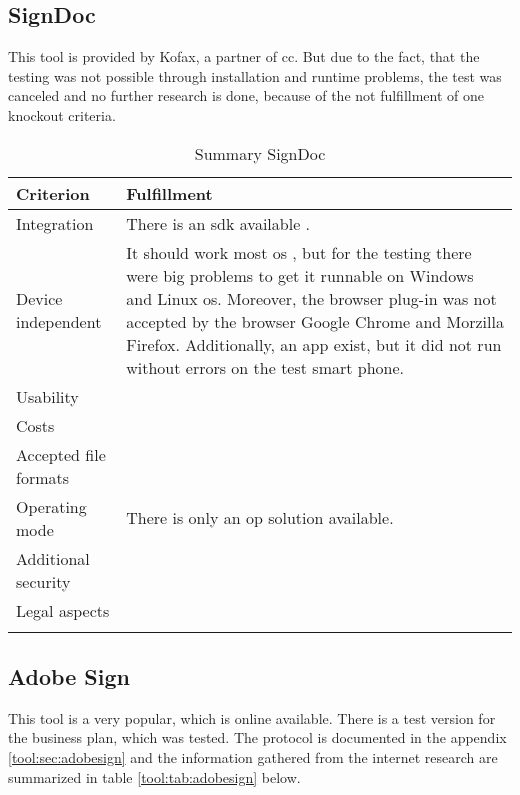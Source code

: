 \subsection{SignDoc}
This tool is provided by Kofax, a partner of \gls{cc}. But due to the fact, that the testing was not possible through installation and runtime problems, the test was canceled and no further research is done, because of the not fulfillment of one knockout criteria. 

	\begin{longtable}{|p{4cm}|p{10cm}|} \hline
		\rowcolor{Gray}Criterion & Fulfillment \\ \hline
		Integration & There is an \gls{sdk} available \parencite{kofax2018sdk}. \\ \hline
		Device independent & It should work most \gls{os} \parencite{kofax2018sdk}, but for the testing there were big problems to get it runnable on Windows and Linux \gls{os}. Moreover, the browser plug-in was not accepted by the browser Google Chrome and Morzilla Firefox. Additionally, an \gls{app} exist, but it did not run without errors on the test smart phone. \\ \hline
		Usability & \\ \hline
		Costs & \\ \hline
		Accepted file formats & \\ \hline
		Operating mode & There is only an \gls{op} solution available.\\ \hline
		Additional security & \\ \hline
		Legal aspects & \\ \hline
	\caption{Summary SignDoc}
	\label{tool:tab:signdoc}
	\end{longtable}

\subsection{Adobe Sign}
This tool is a very popular, which is online available. There is a test version for the business plan, which was tested. The protocol is documented in the appendix \ref{tool:sec:adobesign} and the information gathered from the internet research are summarized in table \ref{tool:tab:adobesign} below. 
	
